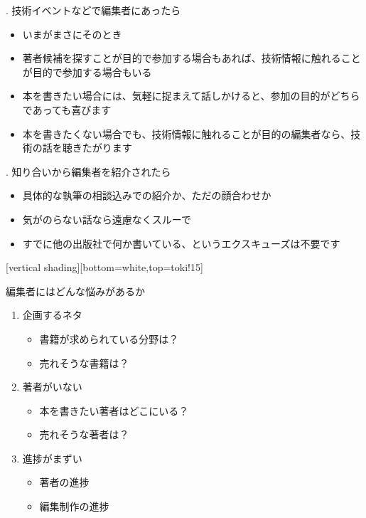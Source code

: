 \documentclass[14pt,dvipdfmx,uplatex]{beamer}
\begin{document}
\begin{frame}[t]{. 技術イベントなどで編集者にあったら}
  \sffamily
  \begin{itemize}
    \item いまがまさにそのとき
    \item 著者候補を探すことが目的で参加する場合もあれば、技術情報に触れることが目的で参加する場合もいる
    \item 本を書きたい場合には、気軽に捉まえて話しかけると、参加の目的がどちらであっても喜びます
    \item 本を書きたくない場合でも、技術情報に触れることが目的の編集者なら、技術の話を聴きたがります
  \end{itemize}
\end{frame}

\begin{frame}[t]{. 知り合いから編集者を紹介されたら}
  \sffamily
  \begin{itemize}
    \item 具体的な執筆の相談込みでの紹介か、ただの顔合わせか
    \item 気がのらない話なら遠慮なくスルーで
    \item すでに他の出版社で何か書いている、というエクスキューズは不要です
  \end{itemize}
\end{frame}

[vertical shading][bottom=white,top=toki!15]

\begin{frame}[t]{\inhibitglue 編集者にはどんな悩みがあるか}
  \sffamily
    \begin{enumerate}
      \item<gray@1-> {\color{10gray} 企画するネタ}
        \begin{itemize}
          \item {\color{10gray}書籍が求められている分野は？}
          \item {\color{10gray}売れそうな書籍は？\\[3ex]}
        \end{itemize} 
      \item<gray@1-> {\color{10gray} 著者がいない}
        \begin{itemize}
          \item {\color{10gray} 本を書きたい著者はどこにいる？}
          \item {\color{10gray} 売れそうな著者は？\\[3ex]}
        \end{itemize} 
      \item 進捗がまずい
        \begin{itemize}
          \item 著者の進捗
          \item 編集制作の進捗
        \end{itemize}
    \end{enumerate}
\end{frame}
\end{document}

